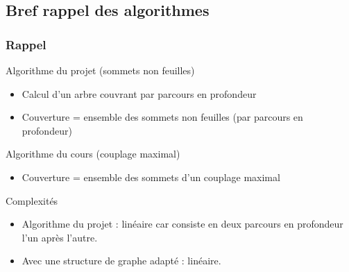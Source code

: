   \subsection{Bref rappel des algorithmes}
  \begin{frame}
   \frametitle{Rappel}

   \begin{block}{Algorithme du projet (sommets non feuilles)}
    \begin{itemize}
     \item Calcul d'un arbre couvrant par parcours en profondeur
     \item Couverture = ensemble des sommets non feuilles (par parcours
	   en profondeur)
    \end{itemize}
   \end{block}

   \begin{block}{Algorithme du cours (couplage maximal)}
    \begin{itemize}
     \item Couverture = ensemble des sommets d'un couplage maximal
    \end{itemize}
   \end{block}

   \begin{block}{Complexités}
    \begin{itemize}
     \item Algorithme du projet : linéaire car consiste en deux parcours
	   en profondeur l'un après l'autre.
     \item Avec une structure de graphe adapté : linéaire.
    \end{itemize}
   \end{block}
  \end{frame}

